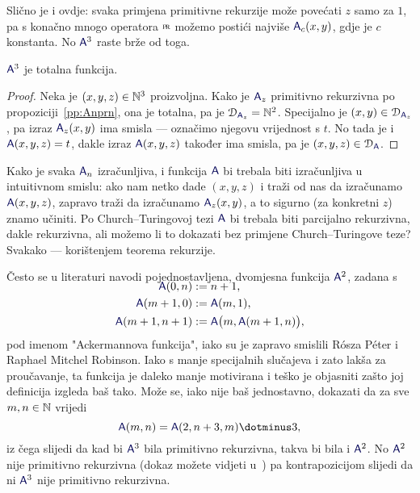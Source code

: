 Slično je i ovdje: svaka primjena primitivne rekurzije može povećati $z$ samo za $1$, pa s konačno mnogo operatora $\pr$ možemo postići najviše $\f A_c(x,y)$, gdje je $c$ konstanta. No $\f A^3$ raste brže od toga.

\begin{korolar}[{name=[totalnost Ackermannove funkcije]}]\label{kor:A3tot}
$\f A^3$ je totalna funkcija.
\end{korolar}
\begin{proof}
Neka je $(x,y,z)\in{\mathbb N}^3$ proizvoljna. Kako je $\f A_z$ primitivno rekurzivna po propoziciji~\ref{pp:Anprn}, ona je totalna, pa je $\dom{\f A_z}=\N^2$. Specijalno je $(x,y)\in\dom{\f A_z}$, pa izraz $\f A_z(x,y)$ ima smisla --- označimo njegovu vrijednost s $t$. No tada je i $\f A(x,y,z)=t$, dakle izraz $\f A(x,y,z)$ također ima smisla, pa je $(x,y,z)\in\dom{\f A}$.
\end{proof}

Kako je svaka $\f A_n$ izračunljiva, i funkcija $\f A$ bi trebala biti izračunljiva u intuitivnom smislu: ako nam netko dade $(x,y,z)$ i traži od nas da izračunamo $\f A(x,y,z)$, zapravo traži da izračunamo $\f A_z(x,y)$, a to sigurno (za konkretni $z$) znamo učiniti. Po Church--\!Turingovoj tezi $\f A$ bi trebala biti parcijalno rekurzivna, dakle rekurzivna, ali možemo li to dokazati bez primjene Church--\!Turingove teze? Svakako --- korištenjem teorema rekurzije.

\begin{napomena}[{name=[dvomjesna Ackermannova funkcija]}]
Često se u literaturi navodi pojednostavljena, dvomjesna funkcija $\f A^2$, zadana s
\begin{align}
\SwapAboveDisplaySkip
    \f A(0,n)&:=n+1\text,\\
    \f A(m+1,0)&:=\f A(m,1)\text,\\
    \f A(m+1,n+1)&:=\f A\bigl(m,\f A(m+1,n)\bigr)\text,
\end{align}
pod imenom "Ackermannova funkcija", iako su je zapravo smislili R\'osza P\'eter i Raphael Mitchel Robinson. Iako s manje specijalnih slučajeva i zato lakša za proučavanje, ta funkcija je daleko manje motivirana i teško je objasniti zašto joj definicija izgleda baš tako. Može se, iako nije baš jednostavno, dokazati da za sve $m,n\in{\mathbb N}$ vrijedi
\begin{equation}
    \f A(m,n)=\f A(2,n+3,m)\dotminus3\text,
\end{equation}
iz čega slijedi da kad bi $\f A^3$ bila primitivno rekurzivna, takva bi bila i $\f A^2$. No $\f A^2$ nije primitivno rekurzivna (dokaz možete vidjeti u~\cite{skr:Vuk}) pa kontrapozicijom slijedi da ni $\f A^3$ nije primitivno rekurzivna.
\end{napomena}

